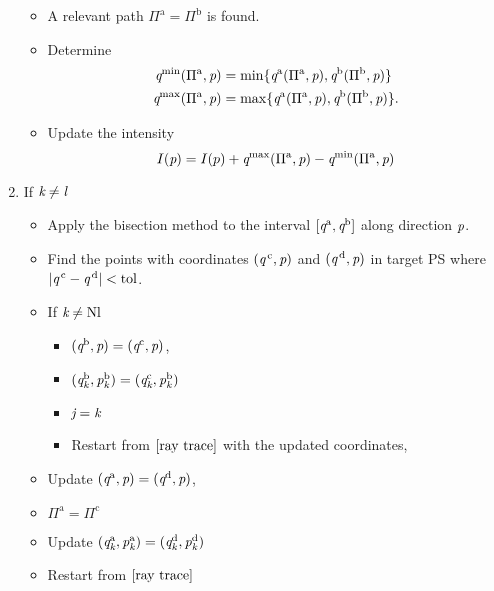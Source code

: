 \begin{enumerate}
\begin{itemize}
\item A relevant path $\Pi^{\textrm{a}} = \Pi^{\textrm{b}}$ is found. 
\item Determine 
\begin{equation*}
\begin{aligned}
\textit{q}^{\textrm{min}}(\Pi^{\textrm{a}}, \textit{p})&=\min\{\textit{q}^{\textrm{a}}(\Pi^{\textrm{a}}, \textit{p}), \textit{q}^{\textrm{b}}(\Pi^{\textrm{b}}, \textit{p})\}\\ 
\textit{q}^{\textrm{max}}(\Pi^{\textrm{a}}, \textit{p})&=\max\{\textit{q}^{\textrm{a}}(\Pi^{\textrm{a}}, \textit{p}), \textit{q}^{\textrm{b}}(\Pi^{\textrm{b}}, \textit{p})\}.
\end{aligned}
\end{equation*}
\item Update the intensity $$I(\textit{p}) = I(p)+\textit{q}^{\textrm{max}}(\Pi^{\textrm{a}}, \textit{p})-\textit{q}^{\textrm{min}}(\Pi^{\textrm{a}}, \textit{p})$$
\end{itemize}
\item If $\textit{k}\neq\textit{l}$ 
\begin{itemize}
\item Apply the bisection method to the interval $[\textit{q}^{\textrm{a}}, \textit{q}^{\textrm{b}}]$ along direction $\textit{p}$.
\item Find the points with coordinates $(\textit{q}^{\,\textrm{c}}, \textit{p})$ and $(\textit{q}^{\,\textrm{d}}, \textit{p})$ in target PS  where $|\textit{q}^{\,\textrm{c}}-\textit{q}^{\,\textrm{d}}|<\textrm{tol}$. 
\item If $\textit{k}\neq\textrm{Nl}$
\begin{itemize}
\item $(\textit{q}^{\textrm{b}}, \textit{p}) = (\textit{q}^{\textrm{c}}, \textit{p})$,
\item $(\textit{q}_{\textit{k}}^{\textrm{b}}, \textit{p}_{\textit{k}}^{\textrm{b}}) = (\textit{q}_{\textit{k}}^{\textrm{c}}, \textit{p}_{\textit{k}}^{\textrm{b}})$
\item $\textit{j} = \textit{k}$
\item Restart from $\ref{ray trace}$ with the updated coordinates,
\end{itemize}
\item Update $(\textit{q}^{\textrm{a}}, \textit{p} )= (\textit{q}^{\textrm{d}}, \textit{p})$,
\item $\Pi^{\textrm{a}} = \Pi^{\textrm{c}}$
\item Update $(\textit{q}_{\textit{k}}^{\textrm{a}}, \textit{p}_{\textit{k}}^{\textrm{a}}) = (\textit{q}_{\textit{k}}^{\textrm{d}}, \textit{p}_{\textit{k}}^{\textrm{d}})$
\item Restart from $\ref{ray trace}$
\end{itemize}
\end{enumerate}
